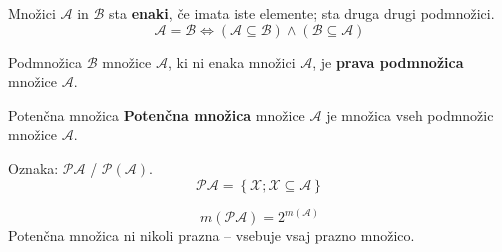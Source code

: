         \begin{frame}
            \begin{block}{}
                Množici $\mathcal{A}$ in $\mathcal{B}$ sta \textbf{enaki}, če imata iste elemente; 
                sta druga drugi podmnožici.
                $$\mathcal{A}=\mathcal{B}\Leftrightarrow(\mathcal{A}\subseteq\mathcal{B})\land(\mathcal{B}\subseteq\mathcal{A})$$
            \end{block}

            \begin{block}{}
                Podmnožica $\mathcal{B}$ množice $\mathcal{A}$, ki ni enaka množici $\mathcal{A}$, 
                je \textbf{prava podmnožica} množice $\mathcal{A}$.
            \end{block}

            \begin{alertblock}{Potenčna množica}
                \textbf{Potenčna množica} množice $\mathcal{A}$ je množica vseh podmnožic množice $\mathcal{A}$.
                
                Oznaka: $\mathbf{\mathcal{P}\mathcal{A}}$ / $\mathbf{\mathcal{P}(\mathcal{A})}$.
                $$ \mathcal{PA}=\left\{\mathcal{X}; \mathcal{X}\subseteq\mathcal{A} \right\}$$
            \end{alertblock}

            \begin{block}{}
                $$ m(\mathcal{PA})=2^{m(\mathcal{A})}$$
                Potenčna množica ni nikoli prazna -- vsebuje vsaj prazno množico.
            \end{block}
        \end{frame}

